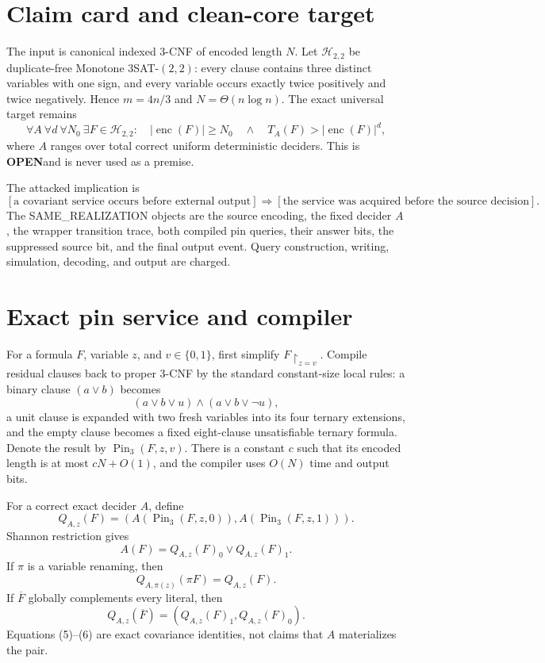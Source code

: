 \documentclass[11pt]{article}
\newcommand{\Htwo}{\mathcal H_{2,2}}
\newcommand{\OPEN}{\textbf{OPEN}}
\begin{document}
\section{Claim card and clean-core target}

The input is canonical indexed 3-CNF of encoded length $N$.  Let $\Htwo$ be
duplicate-free Monotone 3SAT-$(2,2)$: every clause contains three distinct
variables with one sign, and every variable occurs exactly twice positively
and twice negatively.  Hence $m=4n/3$ and $N=\Theta(n\log n)$.  The exact
universal target remains
\[
 \forall A\ \forall d\ \forall N_0\ \exists F\in\Htwo:\quad
 |\operatorname{enc}(F)|\ge N_0\quad\land\quad
 T_A(F)>|\operatorname{enc}(F)|^d,                       \tag{1}
\]
where $A$ ranges over total correct uniform deterministic deciders.  This is
\OPEN and is never used as a premise.

The attacked implication is
\[
 \left[\text{a covariant service occurs before external output}\right]
 \Longrightarrow
 \left[\text{the service was acquired before the source decision}\right]. \tag{2}
\]
The SAME\_REALIZATION objects are the source encoding, the fixed decider $A$,
the wrapper transition trace, both compiled pin queries, their answer bits,
the suppressed source bit, and the final output event.  Query construction,
writing, simulation, decoding, and output are charged.

\section{Exact pin service and compiler}

For a formula $F$, variable $z$, and $v\in\{0,1\}$, first simplify
$F\upharpoonright_{z=v}$.  Compile residual clauses back to proper 3-CNF by
the standard constant-size local rules: a binary clause $(a\vee b)$ becomes
\[
 (a\vee b\vee u)\wedge(a\vee b\vee\neg u),
\]
a unit clause is expanded with two fresh variables into its four ternary
extensions, and the empty clause becomes a fixed eight-clause unsatisfiable
ternary formula.  Denote the result by $\operatorname{Pin}_3(F,z,v)$.  There
is a constant $c$ such that its encoded length is at most $cN+O(1)$, and the
compiler uses $O(N)$ time and output bits.

For a correct exact decider $A$, define
\[
 Q_{A,z}(F)=
 \left(A(\operatorname{Pin}_3(F,z,0)),
       A(\operatorname{Pin}_3(F,z,1))\right).             \tag{3}
\]
Shannon restriction gives
\[
 A(F)=Q_{A,z}(F)_0\vee Q_{A,z}(F)_1.                     \tag{4}
\]
If $\pi$ is a variable renaming, then
\[
 Q_{A,\pi(z)}(\pi F)=Q_{A,z}(F).                         \tag{5}
\]
If $\overline F$ globally complements every literal, then
\[
 Q_{A,z}(\overline F)=
 \left(Q_{A,z}(F)_1,Q_{A,z}(F)_0\right).                 \tag{6}
\]
Equations (5)--(6) are exact covariance identities, not claims that $A$
materializes the pair.
\end{document}

